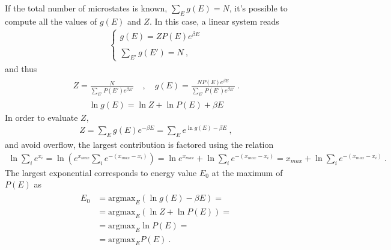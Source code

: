 \documentclass[letterpaper,10pt,english]{jupyterBook}
\begin{document}
\sphinxAtStartPar
If the total number of microstates is known, \(\sum_E g(E) = N\), it’s possible to compute all the values of \(g(E)\) and \(Z\). In this case, a linear system reads
\begin{equation*}
\begin{split}\begin{cases} 
  g(E) = Z P(E) e^{\beta E} \\ \\
  \displaystyle\sum_{E'} g(E') = N \ ,
\end{cases}\end{split}
\end{equation*}
\sphinxAtStartPar
and thus
\begin{equation*}
\begin{split}\begin{aligned}
  Z = \frac{N}{\sum_{E'} P(E') e^{\beta E'}} \quad , \quad
  g(E) = \frac{N P(E) e^{\beta E}}{\sum_{E'} P(E') e^{\beta E'}} \ .
\end{aligned}\end{split}
\end{equation*}
\sphinxAtStartPar
{}
\begin{equation*}
\begin{split}\ln g(E) = \ln Z + \ln P(E) + \beta E\end{split}
\end{equation*}
\sphinxAtStartPar
In order to evaluate \(Z\),
\begin{equation*}
\begin{split}Z = \sum_{E} g(E) e^{-\beta E} = \sum_{E} e^{\ln g(E) - \beta E} \ ,\end{split}
\end{equation*}
\sphinxAtStartPar
and avoid overflow, the largest contribution is factored using the relation
\begin{equation*}
\begin{split}\ln \sum_i e^{x_i} = \ln \left( e^{x_{max}} \sum_i  e^{-(x_{max}-x_i)} \right) = \ln e^{x_{max}} + \ln \sum_i e^{-(x_{max} - x_i )} = x_{max} +  \ln \sum_i e^{-(x_{max} - x_i )} \ .\end{split}
\end{equation*}
\sphinxAtStartPar
The largest exponential corresponds to energy value \(E_0\) at the maximum of \(P(E)\) as
\begin{equation*}
\begin{split}\begin{aligned}
  E_0
  & = \text{argmax}_{E} \left( \ln g(E) - \beta E \right) =  \\
  & = \text{argmax}_{E} \left( \ln Z + \ln P(E) \right) =  \\
  & = \text{argmax}_{E} \ln P(E) = \\
  & = \text{argmax}_E P(E) \ .
\end{aligned}\end{split}
\end{equation*}
\end{document}
